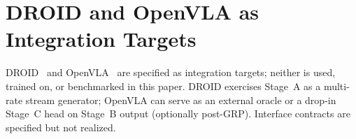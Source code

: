 \section{DROID and OpenVLA as Integration Targets}
\label{sec:droid-openvla}

DROID~\citep{khazatsky2024droid} and OpenVLA~\citep{kim2024openvla} are
specified as integration targets; neither is used, trained on, or
benchmarked in this paper. DROID exercises Stage~A as a multi-rate
stream generator; OpenVLA can serve as an external oracle or a
drop-in Stage~C head on Stage~B output (optionally post-GRP). Interface
contracts are specified but not realized.
